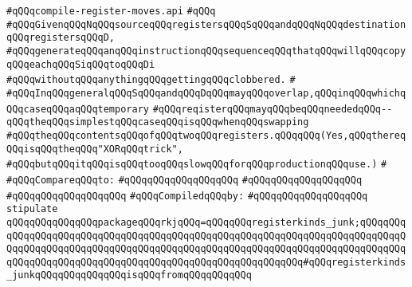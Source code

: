 \label{src/lib/compiler/back/low/code/compile-register-moves.api}
\verb|#qQQqcompile-register-moves.api|\newline
\verb|#qQQq|\newline
\verb|#qQQqGivenqQQqNqQQqsourceqQQqregistersqQQqSqQQqandqQQqNqQQqdestinationqQQqregistersqQQqD,|\newline
\verb|#qQQqgenerateqQQqanqQQqinstructionqQQqsequenceqQQqthatqQQqwillqQQqcopyqQQqeachqQQqSiqQQqtoqQQqDi|\newline
\verb|#qQQqwithoutqQQqanythingqQQqgettingqQQqclobbered.|\newline
\verb|#|\newline
\verb|#qQQqInqQQqgeneralqQQqSqQQqandqQQqDqQQqmayqQQqoverlap,qQQqinqQQqwhichqQQqcaseqQQqaqQQqtemporary|\newline
\verb|#qQQqreqisterqQQqmayqQQqbeqQQqneededqQQq--qQQqtheqQQqsimplestqQQqcaseqQQqisqQQqwhenqQQqswapping|\newline
\verb|#qQQqtheqQQqcontentsqQQqofqQQqtwoqQQqregisters.qQQqqQQq(Yes,qQQqthereqQQqisqQQqtheqQQq"XORqQQqtrick",|\newline
\verb|#qQQqbutqQQqitqQQqisqQQqtooqQQqslowqQQqforqQQqproductionqQQquse.)|\newline
\verb|#|\newline
\verb|#qQQqCompareqQQqto:|\newline
\verb|#qQQqqQQqqQQqqQQqqQQq|\newline
\verb|#qQQqqQQqqQQqqQQqqQQq|\newline
\verb|#qQQqqQQqqQQqqQQqqQQq|\newline
\newline
\verb|#qQQqCompiledqQQqby:|\newline
\verb|#qQQqqQQqqQQqqQQqqQQq|\newline
\newline
\verb|stipulate|\newline
\verb|qQQqqQQqqQQqqQQqpackageqQQqrkjqQQq=qQQqqQQqregisterkinds_junk;qQQqqQQqqQQqqQQqqQQqqQQqqQQqqQQqqQQqqQQqqQQqqQQqqQQqqQQqqQQqqQQqqQQqqQQqqQQqqQQqqQQqqQQqqQQqqQQqqQQqqQQqqQQqqQQqqQQqqQQqqQQqqQQqqQQqqQQqqQQqqQQqqQQqqQQqqQQqqQQqqQQqqQQqqQQqqQQqqQQqqQQqqQQqqQQqqQQqqQQq#qQQqregisterkinds_junkqQQqqQQqqQQqqQQqisqQQqfromqQQqqQQqqQQq|\newline

